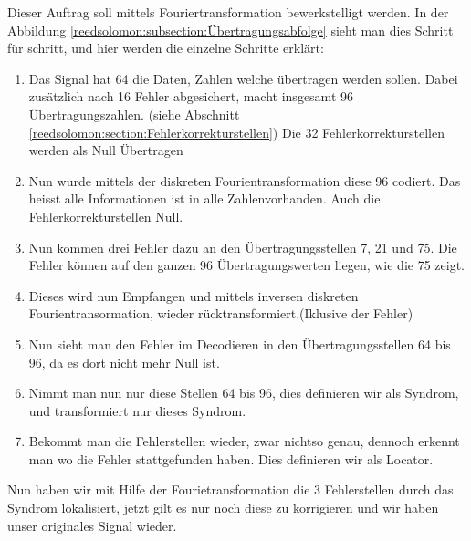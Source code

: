 Dieser Auftrag soll mittels Fouriertransformation bewerkstelligt werden. 
In der Abbildung \ref{reedsolomon:subsection:Übertragungsabfolge} sieht man dies Schritt für schritt,
und hier werden die einzelne Schritte erklärt:
\begin{enumerate}[(1)]
\item Das Signal hat 64 die Daten, Zahlen welche übertragen werden sollen. 
Dabei zusätzlich nach 16 Fehler abgesichert, macht insgesamt 96 Übertragungszahlen.
(siehe Abschnitt \ref{reedsolomon:section:Fehlerkorrekturstellen})
Die 32 Fehlerkorrekturstellen werden als Null Übertragen
\item Nun wurde mittels der diskreten Fourientransformation diese 96 codiert.
Das heisst alle Informationen ist in alle Zahlenvorhanden. Auch die Fehlerkorrekturstellen Null.
\item Nun kommen drei Fehler dazu an den Übertragungsstellen 7, 21 und 75.
Die Fehler können auf den ganzen 96 Übertragungswerten liegen, wie die 75 zeigt.
\item Dieses wird nun Empfangen und mittels inversen diskreten Fourientransormation, wieder rücktransformiert.(Iklusive der Fehler)
\item Nun sieht man den Fehler im Decodieren in den Übertragungsstellen 64 bis 96, da es dort nicht mehr Null ist.
\item Nimmt man nun nur diese Stellen 64 bis 96, dies definieren wir als Syndrom, und transformiert nur dieses Syndrom.
\item Bekommt man die Fehlerstellen wieder, zwar nichtso genau, dennoch erkennt man wo die Fehler stattgefunden haben. 
Dies definieren wir als Locator.
\end{enumerate}
Nun haben wir mit Hilfe der Fourietransformation die 3 Fehlerstellen durch das Syndrom lokalisiert, 
jetzt gilt es nur noch diese zu korrigieren und wir haben unser originales Signal wieder.

